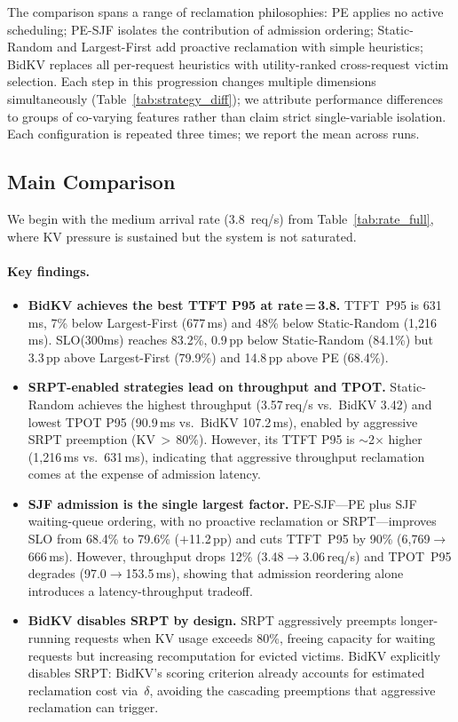 \documentclass[sigconf,nonacm]{acmart}
\newcommand{\bidkv}{BidKV\xspace}
\newcommand{\qualdelta}{\ensuremath{\delta}}
\begin{document}
\noindent
The comparison spans a range of reclamation philosophies: PE applies no
active scheduling; PE-SJF isolates the contribution of admission ordering;
Static-Random and Largest-First add proactive reclamation with simple
heuristics; \bidkv replaces all per-request heuristics with utility-ranked
cross-request victim selection.  Each step in this progression changes multiple
dimensions simultaneously (Table~\ref{tab:strategy_diff}); we attribute
performance differences to groups of co-varying features rather than claim
strict single-variable isolation.  Each configuration is repeated three
times; we report the mean across runs.

\subsection{Main Comparison}\label{sec:eval:main}

We begin with the medium arrival rate (3.8~req/s) from
Table~\ref{tab:rate_full}, where KV pressure is sustained but the system is
not saturated.

\paragraph{Key findings.}
\begin{itemize}[leftmargin=*,nosep]
\item \textbf{\bidkv achieves the best TTFT P95 at rate\,=\,3.8.}
  TTFT~P95 is 631\,ms, 7\% below Largest-First (677\,ms) and
  48\% below Static-Random (1{,}216\,ms).  SLO(300ms) reaches 83.2\%,
  0.9\,pp below Static-Random (84.1\%) but 3.3\,pp above Largest-First
  (79.9\%) and 14.8\,pp above PE (68.4\%).

\item \textbf{SRPT-enabled strategies lead on throughput and TPOT.}
  Static-Random achieves the highest throughput (3.57\,req/s vs.\ \bidkv
  3.42) and lowest TPOT P95 (90.9\,ms vs.\ \bidkv 107.2\,ms), enabled by
  aggressive SRPT preemption (KV\,$>$\,80\%).  However, its TTFT P95 is
  ${\sim}$2$\times$ higher (1{,}216\,ms vs.\ 631\,ms), indicating that
  aggressive throughput reclamation comes at the expense of admission latency.

\item \textbf{SJF admission is the single largest factor.}
  PE-SJF---PE plus SJF waiting-queue ordering, with no proactive reclamation
  or SRPT---improves SLO from 68.4\% to 79.6\% ($+$11.2\,pp) and cuts
  TTFT~P95 by 90\% (6{,}769$\to$666\,ms).  However, throughput drops 12\%
  (3.48$\to$3.06\,req/s) and TPOT~P95 degrades (97.0$\to$153.5\,ms),
  showing that admission reordering alone introduces a
  latency-throughput tradeoff.

\item \textbf{\bidkv disables SRPT by design.}
  SRPT aggressively preempts longer-running requests when KV usage
  exceeds 80\%, freeing capacity for waiting requests but increasing
  recomputation for evicted victims.  \bidkv explicitly disables SRPT:
  BidKV's scoring criterion already accounts for estimated reclamation cost
  via~$\qualdelta$, avoiding the cascading preemptions that aggressive
  reclamation can trigger.
\end{itemize}
\end{document}
